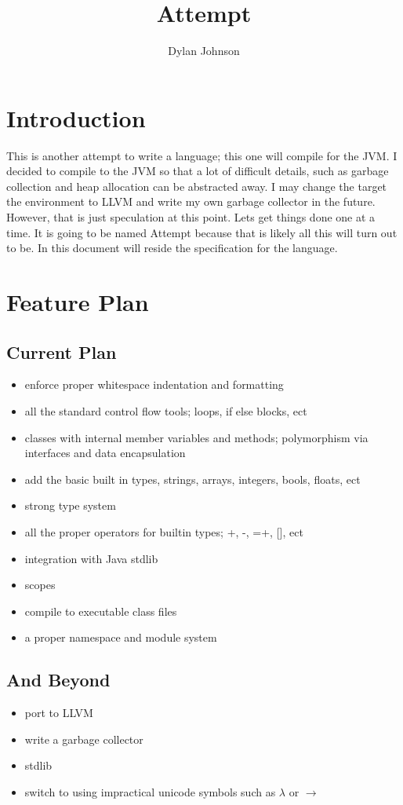 \documentclass{article}
\author{Dylan Johnson}
\title{Attempt}
\newcommand{\centersec}[1]{\section*{\hfil #1 \hfil}}
\newcommand{\subcentersec}[1]{\subsection*{\hfil #1 \hfil}}
\begin{document}
  \maketitle

  \centersec{Introduction}
    This is another attempt to write a language; this one will compile for the JVM. I decided to compile
    to the JVM so that a lot of difficult details, such as garbage collection and heap allocation
    can be abstracted away. I may change the target the environment to LLVM and write my own garbage
    collector in the future. However, that is just speculation at this point. Lets get things done one
    at a time. It is going to be named Attempt because that is likely all this will turn out to be.
    In this document will reside the specification for the language.

  \centersec{Feature Plan}
    \subcentersec{Current Plan}
      \begin{itemize}
        \item{enforce proper whitespace indentation and formatting}
        \item{all the standard control flow tools; loops, if else blocks, ect}
        \item{classes with internal member variables and methods; polymorphism via interfaces and data encapsulation}
        \item{add the basic built in types, strings, arrays, integers, bools, floats, ect}
        \item{strong type system}
        \item{all the proper operators for builtin types; +, -, =+, [], ect}
        \item{integration with Java stdlib}
        \item{scopes}
        \item{compile to executable class files}
        \item{a proper namespace and module system}
      \end{itemize}

    \subcentersec{And Beyond}
      \begin{itemize}
        \item{port to LLVM}
        \item{write a garbage collector}
        \item{stdlib}
        \item{switch to using impractical unicode symbols such as $ \lambda $ or $ \rightarrow $}
      \end{itemize}
\end{document}
